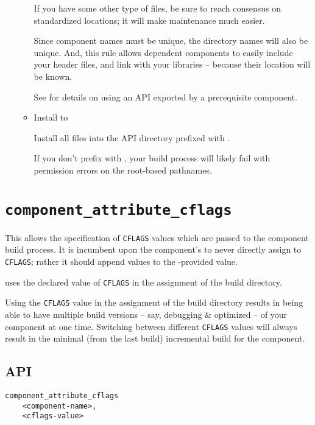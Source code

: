 \begin{itemize}
\begin{itemize}
      If you have some other type of files, be sure to reach consensus
      on standardized locations; it will make maintenance much easier.

      Since component names must be unique, the directory names will
      also be unique.  And, this rule allows dependent components to
      easily include your header files, and link with your libraries
      -- because their location will be known.

      See  for details on using an API
      exported by a prerequisite component.

    \item Install to \destdir

      Install all files into the API directory prefixed with \destdir.

      If you don't prefix with \destdir, your build process will
      likely fail with permission errors on the root-based pathnames.

  \end{itemize}
\end{itemize}

\section{\texttt{component\_attribute\_cflags}}\label{api:cflags}

This allows the specification of \texttt{CFLAGS} values which are
passed to the component build process.  It is incumbent upon the
component's \makefile to never directly assign to \texttt{CFLAGS};
rather it should append values to the \lmsbw-provided value.

\lmsbw uses the declared value of \texttt{CFLAGS} in the assignment of
the build directory.

Using the \texttt{CFLAGS} value in the assignment of the build
directory results in being able to have multiple build versions --
say, debugging \& optimized -- of your component at one time.
Switching between different \texttt{CFLAGS} values will always result
in the minimal (from the last build) incremental build for the
component.

\subsection{API}

\begin{verbatim}
component_attribute_cflags
    <component-name>,
    <cflags-value>
\end{verbatim}

